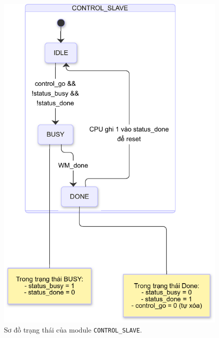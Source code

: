 \begin{figure}[htbp]
    \centering
    \includegraphics[width=0.5\linewidth]{Images/02_11_StateDiagram_ControlSlave}
    \caption{Sơ đồ trạng thái của module \texttt{CONTROL\_SLAVE}.}
    \label{fig:02_11_StateDiagram_ControlSlave}
\end{figure}

